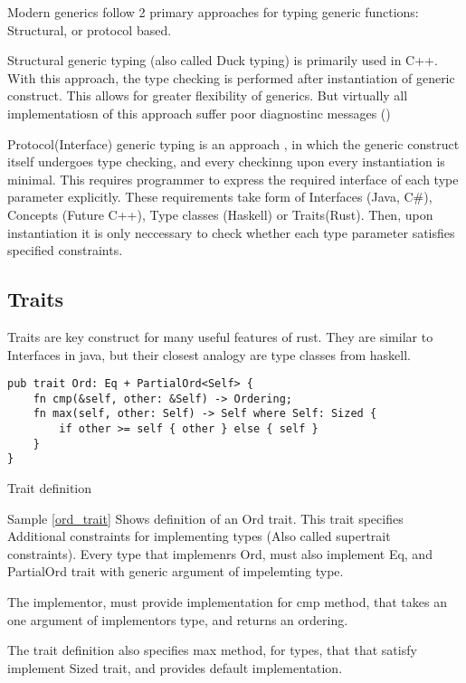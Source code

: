 Modern generics follow 2 primary approaches for typing generic functions: Structural, or protocol based.

Structural generic typing (also called Duck typing) is primarily used in C++. With this approach, the type
checking is performed after instantiation of generic construct. This allows for greater flexibility of generics.
But virtually all implementatiosn of this approach suffer poor diagnostinc messages ()

Protocol(Interface) generic typing is an approach , in which the generic construct itself undergoes type checking, and
every checkinng upon every instantiation is minimal. This requires programmer to express the required interface
of each type parameter explicitly. These requirements take form of Interfaces (Java, C\#), Concepts (Future C++),
Type classes (Haskell) or Traits(Rust). Then, upon instantiation it is only neccessary to check whether
each type parameter satisfies specified constraints.


\subsection{Traits}
Traits are key construct for many useful features of rust. They are similar to Interfaces in java, but
their closest analogy are type classes from haskell.


\begin{listing}[H]
\begin{verbatim}
pub trait Ord: Eq + PartialOrd<Self> {
    fn cmp(&self, other: &Self) -> Ordering;
    fn max(self, other: Self) -> Self where Self: Sized {
        if other >= self { other } else { self }
    }
}
\end{verbatim}
\label{ord_trait}
\caption{Trait definition}
\end{listing}

Sample \ref{ord_trait} Shows definition of an Ord trait. This trait specifies Additional constraints for implementing types
(Also called supertrait constraints). Every type that implemenrs Ord, must also implement Eq, and PartialOrd trait with generic
argument of impelemting type.

The implementor, must provide implementation for cmp method, that takes an one argument of implementors type,
and returns an ordering.

The trait definition also specifies max method, for types, that that satisfy implement Sized trait, and provides default
implementation.


